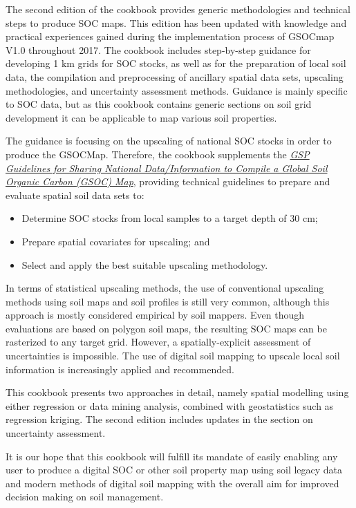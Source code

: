 \documentclass[10pt,b5paper,]{book}
\providecommand{\tightlist}{%
  \setlength{\itemsep}{0pt}\setlength{\parskip}{0pt}}
\theoremstyle{definition}
\theoremstyle{definition}
\theoremstyle{definition}
\theoremstyle{remark}
\begin{document}
The second edition of the cookbook provides generic methodologies and
technical steps to produce SOC maps. This edition has been updated with
knowledge and practical experiences gained during the implementation
process of GSOCmap V1.0 throughout 2017. The cookbook includes
step-by-step guidance for developing 1 km grids for SOC stocks, as well
as for the preparation of local soil data, the compilation and
preprocessing of ancillary spatial data sets, upscaling methodologies,
and uncertainty assessment methods. Guidance is mainly specific to SOC
data, but as this cookbook contains generic sections on soil grid
development it can be applicable to map various soil properties.

The guidance is focusing on the upscaling of national SOC stocks in
order to produce the GSOCMap. Therefore, the cookbook supplements the
\href{http://www.fao.org/3/a-bp164e.pdf}{\emph{GSP Guidelines for
Sharing National Data/Information to Compile a Global Soil Organic
Carbon (GSOC) Map}}, providing technical guidelines to prepare and
evaluate spatial soil data sets to:

\begin{itemize}
\tightlist
\item
  Determine SOC stocks from local samples to a target depth of 30 cm;
\item
  Prepare spatial covariates for upscaling; and
\item
  Select and apply the best suitable upscaling methodology.
\end{itemize}

In terms of statistical upscaling methods, the use of conventional
upscaling methods using soil maps and soil profiles is still very
common, although this approach is mostly considered empirical by soil
mappers. Even though evaluations are based on polygon soil maps, the
resulting SOC maps can be rasterized to any target grid. However, a
spatially-explicit assessment of uncertainties is impossible. The use of
digital soil mapping to upscale local soil information is increasingly
applied and recommended.

This cookbook presents two approaches in detail, namely spatial
modelling using either regression or data mining analysis, combined with
geostatistics such as regression kriging. The second edition includes
updates in the section on uncertainty assessment.

It is our hope that this cookbook will fulfill its mandate of easily
enabling any user to produce a digital SOC or other soil property map
using soil legacy data and modern methods of digital soil mapping with
the overall aim for improved decision making on soil management.
\end{document}
